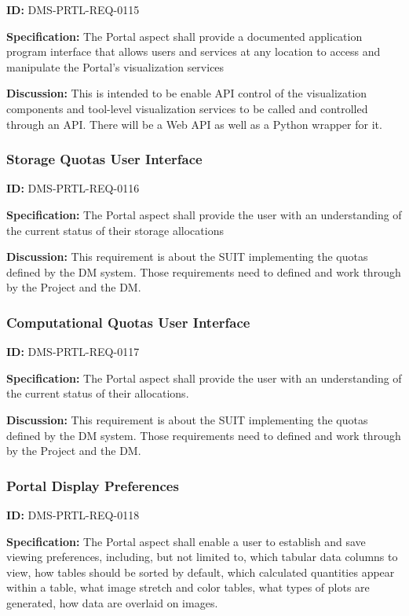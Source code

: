 \documentclass[SE,toc,lsstdraft]{lsstdoc}
\begin{document}
\label{DMS-PRTL-REQ-0115}
\textbf{ID:} DMS-PRTL-REQ-0115

\textbf{Specification:}
The Portal aspect shall provide a documented application program interface that allows users and services at any location to access and manipulate the Portal's visualization services

\textbf{Discussion:}
This is intended to be enable API control of the visualization components and tool-level visualization services to be called and controlled through an API.
There will be a Web API as well as a Python wrapper for it.

\subsubsection{Storage Quotas User Interface}

\label{DMS-PRTL-REQ-0116}
\textbf{ID:} DMS-PRTL-REQ-0116

\textbf{Specification:}
The Portal aspect shall provide the user with an understanding of the current status of their storage allocations

\textbf{Discussion:}
This requirement is about the SUIT implementing the quotas defined by the DM system.  Those requirements need to defined and work through by the Project and the DM.

\subsubsection{Computational Quotas User Interface}

\label{DMS-PRTL-REQ-0117}
\textbf{ID:} DMS-PRTL-REQ-0117

\textbf{Specification:}
The Portal aspect shall provide the user with an understanding of the current status of their allocations.

\textbf{Discussion:}
This requirement is about the SUIT implementing the quotas defined by the DM system.  Those requirements need to defined and work through by the Project and the DM.

\subsubsection{Portal Display Preferences}

\label{DMS-PRTL-REQ-0118}
\textbf{ID:} DMS-PRTL-REQ-0118

\textbf{Specification:}
The Portal aspect shall enable a user to establish and save viewing preferences, including, but not limited to, which tabular data columns to view, how tables should be sorted by default, which calculated quantities appear within a table, what image stretch and color tables, what types of plots are generated, how data are overlaid on images.
\end{document}
